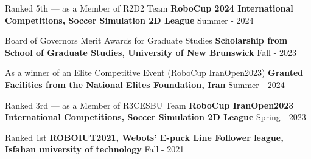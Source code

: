 \begin{cventries}
    
    \cventry
    {Ranked 5th — as a Member of R2D2 Team}
    {\textbf {RoboCup 2024 International Competitions, Soccer Simulation 2D League}}
    {}
    {Summer - 2024}
    {}
    
    
    \cventry
    {Board of Governors Merit Awards for Graduate Studies}
    {\textbf {Scholarship from School of Graduate Studies, University of New Brunswick}}
    {}
    {Fall - 2023}
    {}

    \cventry
    {As a winner of an Elite Competitive Event (RoboCup IranOpen2023)}
    {\textbf {Granted Facilities from the National Elites Foundation, Iran}}
    {}
    {Summer - 2024}
    {}


    \cventry
    {Ranked 3rd — as a Member of R3CESBU Team}
    {\textbf {RoboCup IranOpen2023 International Competitions, Soccer Simulation 2D League}}
    {}
    {Spring - 2023}
    {}

    

    
    \cventry
    {Ranked 1st}
    {\textbf {ROBOIUT2021, Webots’ E-puck Line Follower league, Isfahan university of technology}}
    {}
    {Fall - 2021}
    {}




\end{cventries}